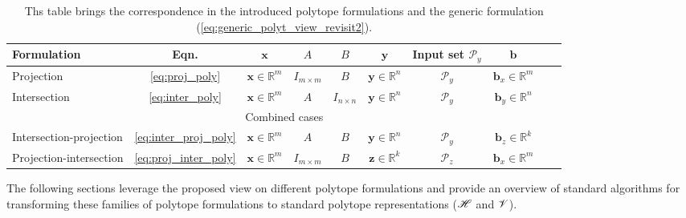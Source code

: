 \begin{table}[!h]
\centering
\begin{tabular}{|l|c|c|c|c|c|c|c|c|c|}
\hline
Formulation & Eqn. & $\bm{x}$ & $A$ & $B$ & $\bm{y}$ & Input set $\mathcal{P}_y$ & $\bm{b}$ \\
\hline
Projection & \ref{eq:proj_poly} & $\bm{x}\in\mathbb{R}^m$ & $I_{m\times m}$& $B$ & $\bm{y}\in\mathbb{R}^n$ & $\mathcal{P}_y$ & $\bm{b}_x\in\mathbb{R}^m$ \\
Intersection & \ref{eq:inter_poly} & $\bm{x}\in\mathbb{R}^m$ & $A$& $I_{n\times n}$ & $\bm{y}\in\mathbb{R}^n$ & $\mathcal{P}_y$ & $\bm{b}_y\in\mathbb{R}^n$ \\
\hline
\multicolumn{10}{c}{Combined cases} \\
\hline
Intersection-projection & \ref{eq:inter_proj_poly} & $\bm{x}\in\mathbb{R}^m$ & $A$& $B$ & $\bm{y}\in\mathbb{R}^n$ & $\mathcal{P}_y$ & $\bm{b}_z\in\mathbb{R}^k$ \\
Projection-intersection & \ref{eq:proj_inter_poly} & $\bm{x}\in\mathbb{R}^m$ & $I_{m\times m}$& $B$ & $\bm{z}\in\mathbb{R}^k$ & $\mathcal{P}_z$ & $\bm{b}_x\in\mathbb{R}^m$ \\
\hline
\end{tabular}
\caption{Ths table brings the correspondence in the introduced polytope formulations and the generic formulation (\ref{eq:generic_polyt_view_revisit2}). }
\label{tab:generic_formulations}
\end{table}

The following sections leverage the proposed view on different polytope formulations and provide an overview of standard algorithms for transforming these families of polytope formulations to standard polytope representations ($\mathscr{H}$ and $\mathscr{V}$). 

